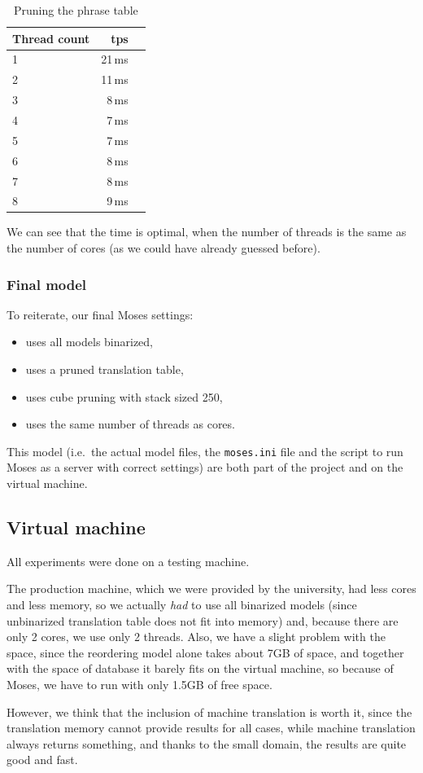 \begin{table}[h]
\begin{center}
\begin{tabular}{|l|r|r|}
    \hline
    \textbf{Thread count} &  \textbf{tps}  \\ \hline
    1 & 21\,ms \\ \hline
    2 & 11\,ms \\ \hline
    3 & 8\,ms \\ \hline
    4 & 7\,ms \\ \hline
    5 & 7\,ms \\ \hline
    6 & 8\,ms \\ \hline
    7 & 8\,ms \\ \hline
    8 & 9\,ms \\ \hline
    
\end{tabular}
\end{center}
\caption{Pruning the phrase table}\label{moses:tablepruning}
\end{table}


We can see that the time is optimal, when the number of threads is the same as the number of cores (as we could have already guessed before).

\subsubsection*{Final model}
To reiterate, our final Moses settings:

\begin{itemize}
    \item uses all models binarized,
    \item uses a pruned translation table,
    \item uses cube pruning with stack sized 250,
    \item uses the same number of threads as cores.
\end{itemize}

This model (i.e.\ the actual model files, the \texttt{moses.ini} file and the script to run Moses as a server with correct settings) are both part of the project and on the virtual machine.

\subsection{Virtual machine}
All experiments were done on a testing machine.

The production machine, which we were provided by the university, had less cores and less memory, so we actually \emph{had} to use all binarized models (since unbinarized translation table does not fit into memory) and, because there are only 2 cores, we use only 2 threads. Also, we have a slight problem with the space, since the reordering model alone takes about 7GB of space, and together with the space of database it barely fits on the virtual machine, so because of Moses, we have to run with only 1.5GB of free space.

However, we think that the inclusion of machine translation is worth it, since the translation memory cannot provide results for all cases, while machine translation always returns something, and thanks to the small domain, the results are quite good and fast.
